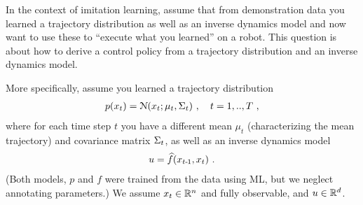 

\renewcommand{\course}{Robot Learning}
\renewcommand{\coursepicture}{roblearn.png}
\renewcommand{\coursedate}{Summer 2024}
\renewcommand{\exnum}{Weekly Exercise 4}

\renewcommand{\teacher}{Marc Toussaint \& Wolfgang H{\"o}nig}
\renewcommand{\addressTUB}{
  Learning~\&~Intelligent~Systems Lab, Intelligent Multi-Robot Coordination Lab, TU~Berlin\\\small
  Marchstr. 23, 10587 Berlin, Germany
}

\exercises




\exercisestitle



In the context of imitation learning, assume that from demonstration data you learned a trajectory distribution as well as an inverse dynamics model and now want to use these to ``execute what you learned'' on a robot. This question is about how to derive a control policy from a trajectory distribution and an inverse dynamics model.

More specifically, assume you learned a trajectory distribution
\begin{align}
p(x_t) = \NN(x_t; \mu_t, \S_t) \comma t=1,..,T ~,
\end{align}
where for each time step $t$ you have a different mean $\mu_t$ (characterizing
the mean trajectory) and covariance matrix $\S_t$, as well as an inverse dynamics model
\begin{align}
u = \hat f(x_{t\1}, x_t) ~.
\end{align}
(Both models, $p$ and $f$ were trained from the data using ML, but we neglect annotating parameters.) We assume $x_t\in\RRR^n$ and fully observable, and $u\in\RRR^d$.

